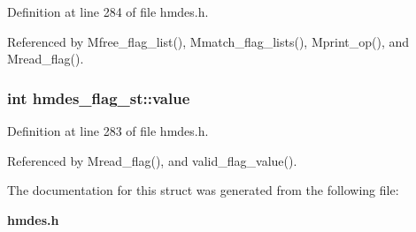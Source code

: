 Definition at line 284 of file hmdes.h.

Referenced by Mfree\_\-flag\_\-list(), Mmatch\_\-flag\_\-lists(), Mprint\_\-op(), and Mread\_\-flag().
\subsubsection{\setlength{\rightskip}{0pt plus 5cm}int \bf{hmdes\_\-flag\_\-st::value}}\label{structhmdes__flag__st_e83a7107208bbaace699ba7b05e06bea}




Definition at line 283 of file hmdes.h.

Referenced by Mread\_\-flag(), and valid\_\-flag\_\-value().

The documentation for this struct was generated from the following file:\begin{CompactItemize}
\item 
\bf{hmdes.h}\end{CompactItemize}
